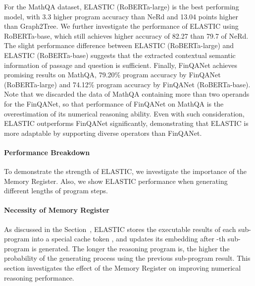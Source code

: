 \documentclass{article}
\begin{document}
For the MathQA dataset, ELASTIC (RoBERTa-large) is the best performing model, with 3.3 higher program accuracy than NeRd and 13.04 points higher than Graph2Tree. We further investigate the performance of ELASTIC using RoBERTa-base, which still achieves higher accuracy of 82.27 than 79.7 of NeRd. The slight performance difference between ELASTIC (RoBERTa-large) and ELASTIC (RoBERTa-base) suggests that the extracted contextual semantic information of passage and question is sufficient. Finally, FinQANet achieves promising results on MathQA, 79.20\% program accuracy by FinQANet (RoBERTa-large) and 74.12\% program accuracy by FinQANet (RoBERTa-base). Note that we discarded the data of MathQA containing more than two operands for the FinQANet, so that performance of FinQANet on MathQA is the overestimation of its numerical reasoning ability. Even with such consideration, ELASTIC outperforms FinQANet significantly, demonstrating that ELASTIC is more adaptable by supporting diverse operators than FinQANet.



\paragraph{Performance Breakdown}
To demonstrate the strength of ELASTIC, we investigate the importance of the Memory Register. Also, we show ELASTIC performance when generating different lengths of program steps.

\paragraph{Necessity of Memory Register}
\label{section: necessity of memory and updating mechanism}

As discussed in the Section~, ELASTIC stores the executable results of each sub-program into a special cache token , and updates its embedding after -th sub-program is generated. The longer the reasoning program is, the higher the probability of the generating process using the previous sub-program result. This section investigates the effect of the Memory Register on improving numerical reasoning performance.
\end{document}
